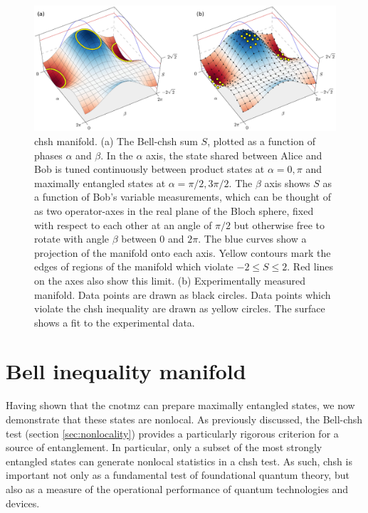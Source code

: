 \begin{figure}[t!]
\centering
\includegraphics[width=.9\linewidth]{chapter3/fig/5.jpg}
\caption[CHSH manifold.]{\acrshort{chsh} manifold.
(a) The Bell-\acrshort{chsh} sum $S$, plotted as a function of phases $\alpha$ and $\beta$. In the $\alpha$ axis, the state shared between Alice and Bob is tuned continuously between product states at $\alpha=0, \pi$ and maximally entangled states at $\alpha=\pi/2, 3\pi/2$. The $\beta$ axis shows $S$ as a function of Bob's variable measurements, which can be thought of as two operator-axes in the real plane of the Bloch sphere, fixed with respect to each other at an angle of $\pi/2$ but otherwise free to rotate with angle $\beta$ between 0 and $2\pi$. The blue curves show a projection of the manifold onto each axis. Yellow contours mark the edges of regions of the manifold which violate $-2 \le S\le 2$. Red lines on the axes also show this limit.
(b) Experimentally measured manifold. Data points are drawn as black circles. Data points which violate the \acrshort{chsh} inequality are drawn as yellow circles. The surface shows a fit to the experimental data.}
\label{fig:chsh}
\end{figure}

\section{Bell inequality manifold}
\label{sec:cnot-mz-chsh}
Having shown that the \gls{cnotmz} can prepare maximally entangled states, we now demonstrate that these states are nonlocal.
As previously discussed, the Bell-\gls{chsh} test (section \ref{sec:nonlocality}) provides a particularly rigorous criterion for a source of entanglement. In particular, only a subset of the most strongly entangled states can generate nonlocal statistics in a \gls{chsh} test. As such, \gls{chsh} is important not only as a fundamental test of foundational quantum theory, but also as a measure of the operational performance of quantum technologies and devices.

